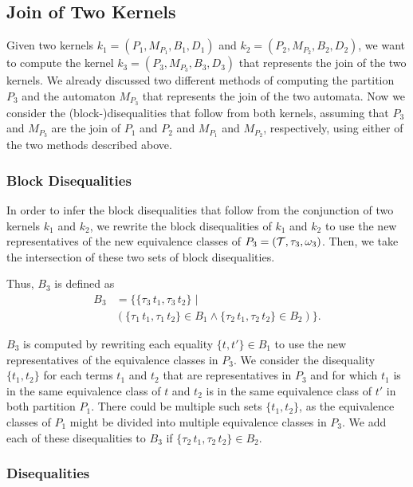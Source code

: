 \subsection{Join of Two Kernels}

Given two kernels $k_1 = (P_1, M_{P_1},B_1, D_1)$ and $k_2 = (P_2, M_{P_2},B_2, D_2)$, we want to compute the kernel $k_3 = (P_3, M_{P_3},B_3, D_3)$ that represents the join of the two kernels.
We already discussed two different methods of computing the partition $P_3$ and the automaton $M_{P_3}$ that represents the join of the two automata.
Now we consider the (block-)disequalities that follow from both kernels,
assuming that $P_3$ and $M_{P_3}$ are the join of $P_1$ and $P_2$ and $M_{P_1}$ and $M_{P_2}$, respectively,
using either of the two methods described above.

\subsubsection{Block Disequalities}

In order to infer the block disequalities that follow from the conjunction of two kernels $k_1$ and $k_2$,
we rewrite the block disequalities of $k_1$ and $k_2$ to use the new representatives of the new equivalence classes of $P_3 = (\mathcal{T}, \tau_3, \omega_3)$.
Then, we take the intersection of these two sets of block disequalities.

Thus, $B_3$ is defined as
\[
\begin{array}{ll}
    B_3 & = \{\{\tau_3\,t_1, \tau_3\,t_2\}  \mid                                                \\
        & (\{\tau_1\,t_1, \tau_1\,t_2\} \in B_1 \land \{\tau_2\,t_1, \tau_2\,t_2\} \in B_2) \}.
\end{array}
\]

$B_3$ is computed by rewriting each equality $\{t, t'\} \in B_1$ to use the new representatives of the equivalence classes in $P_3$.
We consider the disequality $\{t_1, t_2\}$
for each terms $t_1$ and $t_2$ that are representatives in $P_3$ and for
which $t_1$ is in the same equivalence class of $t$ and $t_2$ is in the same equivalence class of $t'$ in both partition $P_1$.
There could be multiple such sets $\{t_1, t_2\}$,
as the equivalence classes of $P_1$ might be divided into multiple equivalence classes in $P_3$.
We add each of these disequalities to $B_3$ if $\{\tau_2\,t_1, \tau_2\,t_2\} \in B_2$.

\subsubsection{Disequalities}

